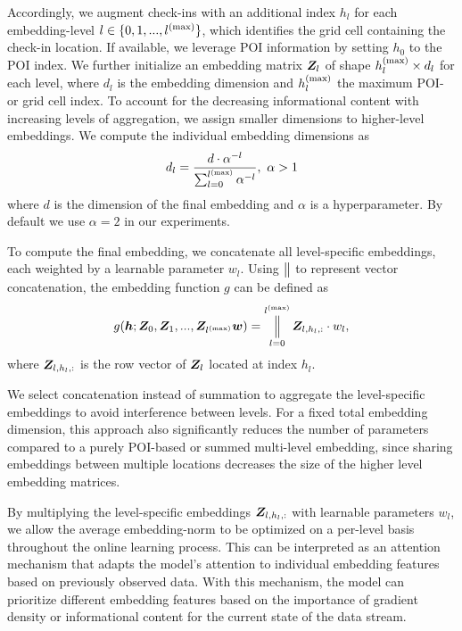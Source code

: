 \documentclass{article} %
\DeclareMathOperator*{\concat}{%
    \mathchoice%
        {\Big\Vert}%
        {\big\Vert}%
        {\Vert}%
        {\Vert}%
}
\theoremstyle{definition}
\begin{document}
Accordingly, we augment check-ins with an additional index $h_l$ for each embedding-level $l \in \{0, 1, ..., l^{(\rm{max})}\}$, which identifies the grid cell containing the check-in location.
If available, we leverage POI information by setting $h_0$ to the POI index.
We further initialize an embedding matrix ${\bm{Z}}_{l}$ of shape $h_l^{\rm{(max)}} \times d_l$ for each level, where $d_l$ is the embedding dimension and $h_l^{\rm{(max)}}$ the maximum POI- or grid cell index.
To account for the decreasing informational content with increasing levels of aggregation, we assign smaller dimensions to higher-level embeddings.
We compute the individual embedding dimensions as
\begin{equation}
    d_l=\frac{d \cdot \alpha^{-l}}{\sum_{l=0}^{l^{\rm{(max)}}} \alpha^{-l}}, \ \alpha > 1
\end{equation}
where $d$ is the dimension of the final embedding and $\alpha$ is a hyperparameter.
By default we use $\alpha=2$ in our experiments.

To compute the final embedding, we concatenate all level-specific embeddings, each weighted by a learnable parameter $w_l$.
Using $\concat$ to represent vector concatenation, the embedding function $g$ can be defined as
\begin{equation}
    g(\vh; \mZ_0, \mZ_1, ..., \mZ_{l^{\rm{(max)}}} \vw) = \concat_{l=0}^{l^{\rm{(max)}}} \mZ_{l,h_l,:} \cdot w_l,
\end{equation}
where ${\bm{Z}}_{l,h_l,:}$ is the row vector of ${\bm{Z}}_l$ located at index $h_l$.

We select concatenation instead of summation to aggregate the level-specific embeddings to avoid interference between levels.
For a fixed total embedding dimension, this approach also significantly reduces the number of parameters compared to a purely POI-based or summed multi-level embedding, since sharing embeddings between multiple locations decreases the size of the higher level embedding matrices.

By multiplying the level-specific embeddings ${\bm{Z}}_{l,h_l,:}$ with learnable parameters $w_l$, we allow the average embedding-norm to be optimized on a per-level basis throughout the online learning process.
This can be interpreted as an attention mechanism that adapts the model's attention to individual embedding features based on previously observed data.
With this mechanism, the model can prioritize different embedding features based on the importance of gradient density or informational content for the current state of the data stream.
\end{document}

